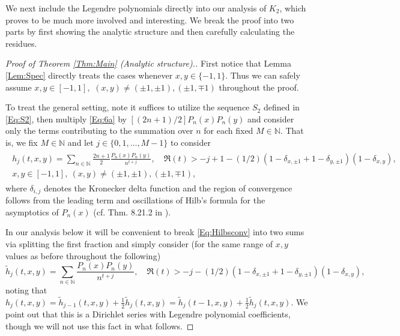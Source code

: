 \documentclass[letterpaper,10pt]{amsart}
\newcommand{\N}{\mathbb N}
\numberwithin{equation}{section}
\begin{document}
We next include the Legendre polynomials directly into our analysis of $K_2$, which proves to be much more involved and interesting. We break the proof into two parts by first showing the analytic structure and then carefully calculating the residues.


\begin{proof}[Proof of Theorem \ref{Thm:Main} (Analytic structure).]
First notice that Lemma \ref{Lem:Spec} directly treats the cases whenever $x,y\in\{-1,1\}$.
Thus we can safely assume $x,y\in[-1,1],$ $(x,y)\neq(\pm1,\pm1),(\pm1,\mp1)$ throughout the proof.

To treat the general setting, note it suffices to utilize the sequence $S_2$ defined in \eqref{Eq:S2}, then multiply \eqref{Eq:6a} by $[(2n+1)/2]P_n(x)P_n(y)$ and consider only the terms contributing to the summation over $n$ for each fixed $M\in\mathbb{N}$. That is, we fix $M\in\mathbb{N}$ and let $j\in\{0,1,\dots,M-1\}$ to consider
\begin{align}\label{Eq:Hilbsconv}
\begin{split}
h_j(t,x,y)=\sum_{n\in \N}\frac{2n+1}{2}\frac{P_n(x)P_n(y)}{n^{t+j}},\quad \Re(t)>-j+1-(1/2)(1-\delta_{x,\pm1}+1-\delta_{y,\pm1})(1-\delta_{x,y}),&\\
x,y\in[-1,1],\ (x,y)\neq(\pm1,\pm1),(\pm1,\mp1),&
\end{split}
\end{align}
where $\delta_{i,j}$ denotes the Kronecker delta function and the region of convergence follows from the leading term and oscillations of Hilb's formula for the asymptotics of $P_n(x)$ (cf. Thm. 8.21.2 in \cite{Sz39}).

In our analysis below it will be convenient to break \eqref{Eq:Hilbsconv} into two sums via splitting the first fraction and simply consider (for the same range of $x,y$ values as before throughout the following)
\begin{equation}\label{Eq:tildeh}
\widetilde{h}_j(t,x,y)=\sum_{n\in \N}\frac{P_n(x)P_n(y)}{n^{t+j}},\quad \Re(t)>-j-(1/2)(1-\delta_{x,\pm1}+1-\delta_{y,\pm1})(1-\delta_{x,y}),
\end{equation}
noting that $h_j(t,x,y)=\widetilde{h}_{j-1}(t,x,y)+\tfrac{1}{2}\widetilde{h}_j(t,x,y)=\widetilde{h}_{j}(t-1,x,y)+\tfrac{1}{2}\widetilde{h}_j(t,x,y)$. We point out that this is a Dirichlet series with Legendre polynomial coefficients, though we will not use this fact in what follows.


\end{proof}
\end{document}
